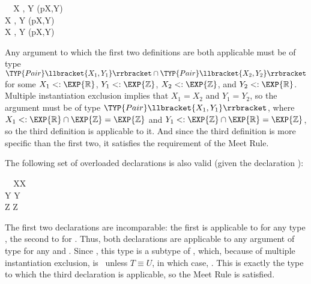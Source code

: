 \documentclass[10pt]{sigplanconf}
\newcommand{\subtypeof}{\ensuremath{<:}}
\newcommand{\ob}[1]{\ensuremath{\llbracket {#1} \rrbracket}}
\newcommand{\Bottom}{\TYP{Bottom}}
\begin{document}
\small
\begin{FortressCode}
{\tt ~~}\+\llbracket{}X \SHORTCUT{<} , Y \SHORTCUT{<} \rrbracket\bigl(p\COLON {}\llbracket{}X,Y\rrbracket\bigr)\COLON {} \\
  \llbracket{}X \SHORTCUT{<} , Y \SHORTCUT{<} \rrbracket\bigl(p\COLON {}\llbracket{}X,Y\rrbracket\bigr)\COLON {} \\
  \llbracket{}X \SHORTCUT{<} , Y \SHORTCUT{<} \rrbracket\bigl(p\COLON {}\llbracket{}X,Y\rrbracket\bigr)\COLON {}\-
\end{FortressCode}
\normalsize
Any argument to which the first two definitions are both applicable 
must be of type $\TYP{Pair}\ob{X_1,Y_1} \cap \TYP{Pair}\ob{X_2,Y_2}$
for some $X_1 \subtypeof \EXP{\mathbb{R}}$, 
$Y_1 \subtypeof \EXP{\mathbb{Z}}$, 
$X_2 \subtypeof \EXP{\mathbb{Z}}$, 
and $Y_2 \subtypeof \EXP{\mathbb{R}}$.
Multiple instantiation exclusion 
implies that $X_1 = X_2$ and $Y_1 = Y_2$,
so the argument must be of type $\TYP{Pair}\ob{X_1,Y_1}$, 
where $X_1 \subtypeof \EXP{\mathbb{R}} \cap \EXP{\mathbb{Z}} = \EXP{\mathbb{Z}}$
and $Y_1 \subtypeof \EXP{\mathbb{Z}} \cap \EXP{\mathbb{R}} = \EXP{\mathbb{Z}}$, 
so the third definition is applicable to it.
And since the third definition is more specific than the first two,
it satisfies the requirement of the Meet Rule.

The following set of overloaded declarations is also valid 
(given the declaration ):

\small
\begin{FortressCode}
{\tt ~~}\+\llbracket{}X\rrbracket{}\llbracket{}X\rrbracket\COLON {} \\
  \llbracket{}Y \SHORTCUT{<} \rrbracket{}\llbracket{}Y\rrbracket\COLON {} \\
  \llbracket{}Z \SHORTCUT{<} \rrbracket{}\llbracket{}Z\rrbracket\COLON {}\-
\end{FortressCode}
\normalsize
The first two declarations are incomparable:
the first is applicable to  for any type ,
the second to  for .
Thus, both declarations are applicable to any argument 
of type  
for any  and .
Since , 
this type is a subtype of , 
which, because of multiple instantiation exclusion, 
is \Bottom\ unless $T \equiv U$,
in which case,
.
This is exactly the type to which the third declaration is applicable, 
so the Meet Rule is satisfied.
\end{document}
